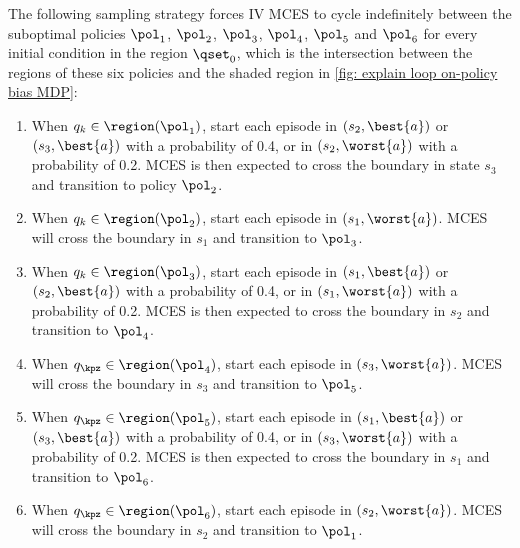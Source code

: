 \documentclass{article}
\newcommand{\mcopi}{MCES}
\begin{document}
The following sampling strategy forces IV MCES to cycle indefinitely between the suboptimal policies $\pol_1$, $\pol_2$, $\pol_3$, $\pol_4$, $\pol_5$ and $\pol_6$ for every initial condition in the region $\qset_0$, which 
is the intersection between the regions of these six policies and the shaded region in \autoref{fig: explain loop on-policy bias MDP}:
\begin{enumerate}
    \item  \label{pg: sampling strat 3 states}
    When $q_k \in \region(\pol_1)$, start each episode in $(s_2, \best{a})$ or $(s_3, \best{a})$ with a probability of 0.4, or in $(s_2, \worst{a})$ with a probability of 0.2.
    \mcopi{} is then expected to cross the boundary in state $s_3$ and transition to policy $\pol_2$.

    \item
    When $q_k \in \region(\pol_2)$, start each episode in $(s_1, \worst{a})$. 
    MCES will cross the boundary in $s_1$ and transition to $\pol_3$.

    \item
    When $q_k \in \region(\pol_3)$, start each episode in $(s_1, \best{a})$ or $(s_2, \best{a})$ with a probability of 0.4, or in $(s_1, \worst{a})$ with a probability of 0.2.
    \mcopi{} is then expected to cross the boundary in $s_2$ and transition to $\pol_4$.

    \item
    When $q_\kpz \in \region(\pol_4)$, start each episode in $(s_3, \worst{a})$. 
    MCES will cross the boundary in $s_3$ and transition to $\pol_5$.

    \item
    When $q_\kpz \in \region(\pol_5)$, start each episode in $(s_1, \best{a})$ or $(s_3, \best{a})$ with a probability of 0.4, or in $(s_3, \worst{a})$ with a probability of 0.2.
    \mcopi{} is then expected to cross the boundary in $s_1$ and transition to $\pol_6$.

    \item
    When $q_\kpz \in \region(\pol_6)$, start each episode in $(s_2, \worst{a})$. 
    \mcopi{} will cross the boundary in $s_2$ and transition to $\pol_1$.
\end{enumerate}
\label{enum: sampling greedy initial visit}
\end{document}

